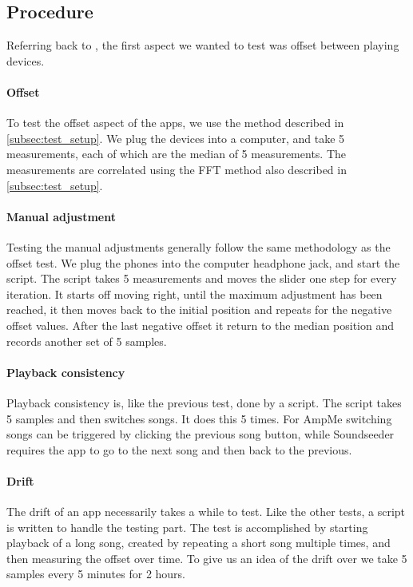 \subsection{Procedure}\label{subsec:procedure}

Referring back to , the
first aspect we wanted to test was offset between playing devices.

\paragraph{Offset}
To test the offset aspect of the apps, we use the method described in
\cref{subsec:test_setup}. We plug the devices into a computer, and take
5 measurements, each of which are the median of 5 measurements. The
measurements are correlated using the FFT method also described in
\cref{subsec:test_setup}.

\paragraph{Manual adjustment}
Testing the manual adjustments generally follow the same methodology as
the offset test. We plug the phones into the computer headphone jack,
and start the script. The script takes 5 measurements and moves the
slider one step for every iteration. It starts off moving right, until
the maximum adjustment has been reached, it then moves back to the
initial position and repeats for the negative offset values. After the
last negative offset it return to the median position and records
another set of 5 samples.

\paragraph{Playback consistency}
Playback consistency is, like the previous test, done by a script. The
script takes 5 samples and then switches songs. It does this 5 times.
For AmpMe switching songs can be triggered by clicking the previous song
button, while Soundseeder requires the app to go to the next song and
then back to the previous.

\paragraph{Drift}
The drift of an app necessarily takes a while to test. Like the other
tests, a script is written to handle the testing part. The test is
accomplished by starting playback of a long song, created by repeating
a short song multiple times, and then measuring the offset over time. To
give us an idea of the drift over we take 5 samples every 5 minutes for
2 hours.

